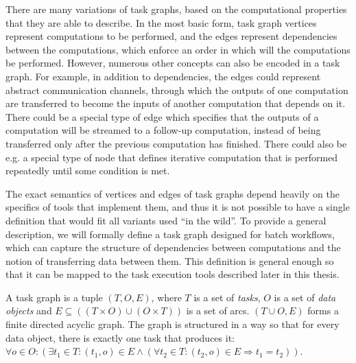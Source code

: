 There are many variations of task graphs, based on the computational properties that they are able
to describe. In the most basic form, task graph vertices represent computations to be performed,
and the edges represent dependencies between the computations, which enforce an order in which will
the computations be performed. However, numerous other concepts can also be encoded in a task
graph. For example, in addition to dependencies, the edges could represent abstract communication
channels, through which the outputs of one computation are transferred to become the inputs of
another computation that depends on it. There could be a special type of edge which specifies that
the outputs of a computation will be streamed to a follow-up computation, instead of being
transferred only after the previous computation has finished. There could also be e.g. a special
type of node that defines iterative computation that is performed repeatedly until some condition
is met.

The exact semantics of vertices and edges of task graphs depend heavily on the specifics of tools
that implement them, and thus it is not possible to have a single definition that would fit all
variants used ``in the wild''. To provide a general description, we will formally define a task
graph designed for batch workflows, which can capture the structure of dependencies between
computations and the notion of transferring data between them. This definition is general enough so
that it can be mapped to the task execution tools described later in this thesis.

A task graph is a tuple $(T, O, E)$, where $T$ is a set of
\emph{tasks}, $O$ is a set of \emph{data objects} and
$E \subseteq ((T\times{}O) \cup (O\times{}T))$ is a set of arcs. $(T \cup O, E)$ forms a finite directed acyclic
graph. The graph is structured in a way so that for every data object, there is exactly one task
that produces it: $\forall o\in{}O: (\exists t_1\in{}T: (t_1, o) \in E \land
(\forall
t_2\in{}T: (t_2, o) \in E \Rightarrow t_1 = t_2))$.

